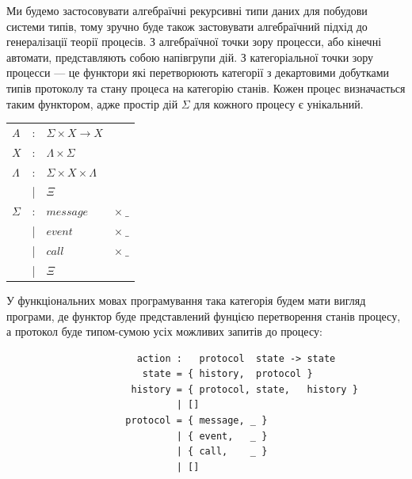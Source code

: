\documentclass[11pt,oneside]{article}
\begin{document}
   Ми будемо застосовувати алгебраїчні рекурсивні типи даних для побудови системи типів, тому
   зручно буде також застовувати алгебраїчний підхід до генералізації теорії процесів.
   З алгебраїчної точки зору процесси, або кінечні автомати, представляють собою напівгрупи дій.
   З категоріальної точки зору процесси --- це функтори які перетворюють категорії з декартовими добутками
   типів протоколу та стану процеса на категорію станів. Кожен процес визначається таким функтором, адже
   простір дій $\Sigma$ для кожного процесу є унікальний.

\begin{center}
\begin{tabular}{lcll}
$A$         &:& $\Sigma   \times X \rightarrow X  $ &\\
$X$         &:& $\Lambda  \times \Sigma           $ &\\
$\Lambda$   &:& $\Sigma   \times X \times \Lambda $ &\\
            &|& $\Xi                              $ &\\
$\Sigma$    &:& $message$ & $\times\ \_$          \\
            &|& $event$   & $\times\ \_$          \\
            &|& $call$    & $\times\ \_$          \\
            &|& $\Xi                              $ &\\
\end{tabular}
\end{center}

   У функціональних мовах програмування така категорія будем мати вигляд програми,
   де функтор буде представлений фунцією перетворення станів процесу, а протокол
   буде типом-сумою усіх можливих запитів до процесу:

\begin{center}
\begin{lstlisting}
                       action :   protocol  state -> state
                        state = { history,  protocol }
                      history = { protocol, state,   history }
                              | []
                     protocol = { message, _ }
                              | { event,   _ }
                              | { call,    _ }
                              | []
\end{lstlisting}

\begin{prooftree}
\end{prooftree}

\end{center}
\end{document}
